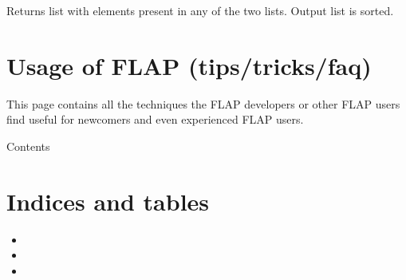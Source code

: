 \documentclass[letterpaper,10pt,english]{sphinxmanual}
\begin{document}

\begin{fulllineitems}
\label{\detokenize{tools:flap.tools.unify_list}}
Returns list with elements present in any of the two lists.
Output list is sorted.

\end{fulllineitems}



\chapter{Usage of FLAP (tips/tricks/faq)}
\label{\detokenize{usage:usage-of-flap-tips-tricks-faq}}\label{\detokenize{usage::doc}}
This page contains all the techniques the FLAP developers or other FLAP
users find useful for newcomers and even experienced FLAP users.

Contents


\chapter{Indices and tables}
\label{\detokenize{index:indices-and-tables}}\begin{itemize}
\item {} 

\item {} 

\item {} 

\end{itemize}
\end{document}
